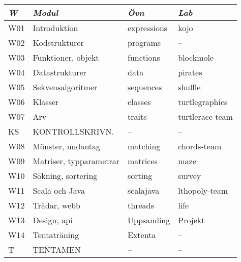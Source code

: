 \begin{tabular}{l|l|l|l}
\textit{W} & \textit{Modul} & \textit{Övn} & \textit{Lab} \\ \hline \hline
W01 & Introduktion & expressions & kojo \\
W02 & Kodstrukturer & programs & -- \\
W03 & Funktioner, objekt & functions & blockmole \\
W04 & Datastrukturer & data & pirates \\
W05 & Sekvensalgoritmer & sequences & shuffle \\
W06 & Klasser & classes & turtlegraphics \\
W07 & Arv & traits & turtlerace-team \\
KS & KONTROLLSKRIVN. & -- & -- \\
W08 & Mönster, undantag & matching & chords-team \\
W09 & Matriser, typparametrar & matrices & maze \\
W10 & Sökning, sortering & sorting & survey \\
W11 & Scala och Java & scalajava & lthopoly-team \\
W12 & Trådar, webb & threads & life \\
W13 & Design, api & Uppsamling & Projekt \\
W14 & Tentaträning & Extenta & -- \\
T & TENTAMEN & -- & -- \\
\end{tabular}
